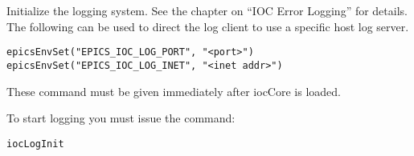Initialize the logging system.
See the chapter on ``IOC Error Logging'' for details.
The following can be used to direct the log client to use a specific host log server.

\begin{verbatim}
epicsEnvSet("EPICS_IOC_LOG_PORT", "<port>")
epicsEnvSet("EPICS_IOC_LOG_INET", "<inet addr>")
\end{verbatim}

These command must be given immediately after iocCore is loaded.

To start logging you must issue the command:

\begin{verbatim}
iocLogInit
\end{verbatim}

